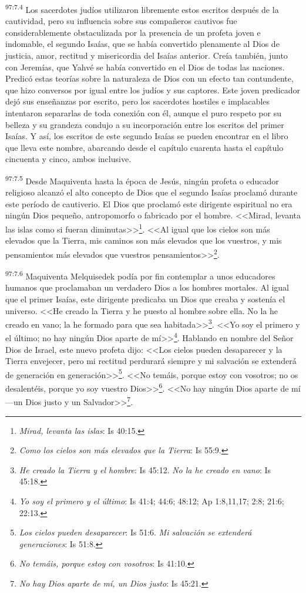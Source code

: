 \par
\textsuperscript{97:7.4} Los sacerdotes judíos utilizaron libremente estos escritos después de la cautividad, pero su influencia sobre sus compañeros cautivos fue considerablemente obstaculizada por la presencia de un profeta joven e indomable, el segundo Isaías, que se había convertido plenamente al Dios de justicia, amor, rectitud y misericordia del Isaías anterior. Creía también, junto con Jeremías, que Yahvé se había convertido en el Dios de todas las naciones. Predicó estas teorías sobre la naturaleza de Dios con un efecto tan contundente, que hizo conversos por igual entre los judíos y sus captores. Este joven predicador dejó sus enseñanzas por escrito, pero los sacerdotes hostiles e implacables intentaron separarlas de toda conexión con él, aunque el puro respeto por su belleza y su grandeza condujo a su incorporación entre los escritos del primer Isaías. Y así, los escritos de este segundo Isaías se pueden encontrar en el libro que lleva este nombre, abarcando desde el capítulo cuarenta hasta el capítulo cincuenta y cinco, ambos inclusive.

\par
\textsuperscript{97:7.5} Desde Maquiventa hasta la época de Jesús, ningún profeta o educador religioso alcanzó el alto concepto de Dios que el segundo Isaías proclamó durante este período de cautiverio. El Dios que proclamó este dirigente espiritual no era ningún Dios pequeño, antropomorfo o fabricado por el hombre. <<Mirad, levanta las islas como si fueran diminutas>>\footnote{\textit{Mirad, levanta las islas}: Is 40:15.}. <<Al igual que los cielos son más elevados que la Tierra, mis caminos son más elevados que los vuestros, y mis pensamientos más elevados que vuestros pensamientos>>\footnote{\textit{Como los cielos son más elevados que la Tierra}: Is 55:9.}.

\par
\textsuperscript{97:7.6} Maquiventa Melquisedek podía por fin contemplar a unos educadores humanos que proclamaban un verdadero Dios a los hombres mortales. Al igual que el primer Isaías, este dirigente predicaba un Dios que creaba y sostenía el universo. <<He creado la Tierra y he puesto al hombre sobre ella. No la he creado en vano; la he formado para que sea habitada>>\footnote{\textit{He creado la Tierra y el hombre}: Is 45:12. \textit{No la he creado en vano}: Is 45:18.}. <<Yo soy el primero y el último; no hay ningún Dios aparte de mí>>\footnote{\textit{Yo soy el primero y el último}: Is 41:4; 44:6; 48:12; Ap 1:8,11,17; 2:8; 21:6; 22:13.}. Hablando en nombre del Señor Dios de Israel, este nuevo profeta dijo: <<Los cielos pueden desaparecer y la Tierra envejecer, pero mi rectitud perdurará siempre y mi salvación se extenderá de generación en generación>>\footnote{\textit{Los cielos pueden desaparecer}: Is 51:6. \textit{Mi salvación se extenderá generaciones}: Is 51:8.}. <<No temáis, porque estoy con vosotros; no os desalentéis, porque yo soy vuestro Dios>>\footnote{\textit{No temáis, porque estoy con vosotros}: Is 41:10.}. <<No hay ningún Dios aparte de mí ---un Dios justo y un Salvador>>\footnote{\textit{No hay Dios aparte de mí, un Dios justo}: Is 45:21.}.

